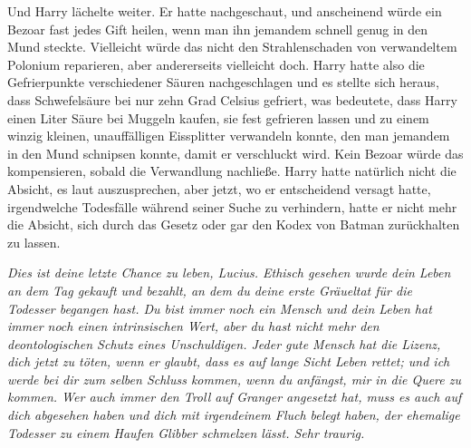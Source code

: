 Und Harry lächelte weiter. Er hatte nachgeschaut, und anscheinend würde ein Bezoar fast jedes Gift heilen, wenn man ihn jemandem schnell genug in den Mund steckte. Vielleicht würde das nicht den Strahlenschaden von verwandeltem Polonium reparieren, aber andererseits vielleicht doch. Harry hatte also die Gefrierpunkte verschiedener Säuren nachgeschlagen und es stellte sich heraus, dass Schwefelsäure bei nur zehn Grad Celsius gefriert, was bedeutete, dass Harry einen Liter Säure bei Muggeln kaufen, sie fest gefrieren lassen und zu einem winzig kleinen, unauffälligen Eissplitter verwandeln konnte, den man jemandem in den Mund schnipsen konnte, damit er verschluckt wird. Kein Bezoar würde das kompensieren, sobald die Verwandlung nachließe. Harry hatte natürlich nicht die Absicht, es laut auszusprechen, aber jetzt, wo er entscheidend versagt hatte, irgendwelche Todesfälle während seiner Suche zu verhindern, hatte er nicht mehr die Absicht, sich durch das Gesetz oder gar den Kodex von Batman zurückhalten zu lassen.

\emph{Dies ist deine letzte Chance zu leben, Lucius. Ethisch gesehen wurde dein Leben an dem Tag gekauft und bezahlt, an dem du deine erste Gräueltat für die Todesser begangen hast. Du bist immer noch ein Mensch und dein Leben hat immer noch einen intrinsischen Wert, aber du hast nicht mehr den deontologischen Schutz eines Unschuldigen. Jeder gute Mensch hat die Lizenz, dich jetzt zu töten, wenn er glaubt, dass es auf lange Sicht Leben rettet; und ich werde bei dir zum selben Schluss kommen, wenn du anfängst, mir in die Quere zu kommen. Wer auch immer den Troll auf Granger angesetzt hat, muss es auch auf dich abgesehen haben und dich mit irgendeinem Fluch belegt haben, der ehemalige Todesser zu einem Haufen Glibber schmelzen lässt. Sehr traurig.}

